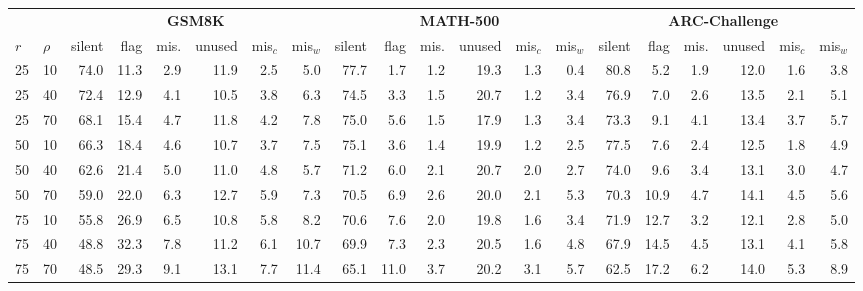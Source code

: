 \begin{tabular}{ll rrrrrr rrrrrr rrrrrr}
\toprule
& & \multicolumn{6}{c}{\textbf{GSM8K}} & \multicolumn{6}{c}{\textbf{MATH-500}} & \multicolumn{6}{c}{\textbf{ARC-Challenge}} \\
\cmidrule(lr){3-8}\cmidrule(lr){9-14}\cmidrule(lr){15-20}
\textbf{$r$} & \textbf{$\rho$} & silent & flag & mis. & unused & mis$_{c}$ & mis$_{w}$ & silent & flag & mis. & unused & mis$_{c}$ & mis$_{w}$ & silent & flag & mis. & unused & mis$_{c}$ & mis$_{w}$ \\
\midrule
25 & 10 & 74.0 & 11.3 & 2.9 & 11.9 & 2.5 & 5.0 & 77.7 & 1.7 & 1.2 & 19.3 & 1.3 & 0.4 & 80.8 & 5.2 & 1.9 & 12.0 & 1.6 & 3.8 \\
25 & 40 & 72.4 & 12.9 & 4.1 & 10.5 & 3.8 & 6.3 & 74.5 & 3.3 & 1.5 & 20.7 & 1.2 & 3.4 & 76.9 & 7.0 & 2.6 & 13.5 & 2.1 & 5.1 \\
25 & 70 & 68.1 & 15.4 & 4.7 & 11.8 & 4.2 & 7.8 & 75.0 & 5.6 & 1.5 & 17.9 & 1.3 & 3.4 & 73.3 & 9.1 & 4.1 & 13.4 & 3.7 & 5.7 \\
50 & 10 & 66.3 & 18.4 & 4.6 & 10.7 & 3.7 & 7.5 & 75.1 & 3.6 & 1.4 & 19.9 & 1.2 & 2.5 & 77.5 & 7.6 & 2.4 & 12.5 & 1.8 & 4.9 \\
50 & 40 & 62.6 & 21.4 & 5.0 & 11.0 & 4.8 & 5.7 & 71.2 & 6.0 & 2.1 & 20.7 & 2.0 & 2.7 & 74.0 & 9.6 & 3.4 & 13.1 & 3.0 & 4.7 \\
50 & 70 & 59.0 & 22.0 & 6.3 & 12.7 & 5.9 & 7.3 & 70.5 & 6.9 & 2.6 & 20.0 & 2.1 & 5.3 & 70.3 & 10.9 & 4.7 & 14.1 & 4.5 & 5.6 \\
75 & 10 & 55.8 & 26.9 & 6.5 & 10.8 & 5.8 & 8.2 & 70.6 & 7.6 & 2.0 & 19.8 & 1.6 & 3.4 & 71.9 & 12.7 & 3.2 & 12.1 & 2.8 & 5.0 \\
75 & 40 & 48.8 & 32.3 & 7.8 & 11.2 & 6.1 & 10.7 & 69.9 & 7.3 & 2.3 & 20.5 & 1.6 & 4.8 & 67.9 & 14.5 & 4.5 & 13.1 & 4.1 & 5.8 \\
75 & 70 & 48.5 & 29.3 & 9.1 & 13.1 & 7.7 & 11.4 & 65.1 & 11.0 & 3.7 & 20.2 & 3.1 & 5.7 & 62.5 & 17.2 & 6.2 & 14.0 & 5.3 & 8.9 \\
\bottomrule
\end{tabular}
